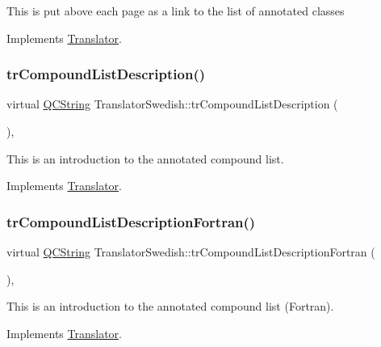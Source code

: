 This is put above each page as a link to the list of annotated classes 

Implements \mbox{\hyperlink{class_translator}{Translator}}.

\mbox{\label{class_translator_swedish_ab92f973f2376b0db20a44d75f3a2132d}} 
\subsubsection{\texorpdfstring{trCompoundListDescription()}{trCompoundListDescription()}}
{\footnotesize\ttfamily virtual \mbox{\hyperlink{class_q_c_string}{Q\+C\+String}} Translator\+Swedish\+::tr\+Compound\+List\+Description (\begin{DoxyParamCaption}{ }\end{DoxyParamCaption})\hspace{0.3cm}{\ttfamily [inline]}, {\ttfamily [virtual]}}

This is an introduction to the annotated compound list. 

Implements \mbox{\hyperlink{class_translator}{Translator}}.

\mbox{\label{class_translator_swedish_aad15dd63cfe4f9bfd79e3b0eea8293d1}} 
\subsubsection{\texorpdfstring{trCompoundListDescriptionFortran()}{trCompoundListDescriptionFortran()}}
{\footnotesize\ttfamily virtual \mbox{\hyperlink{class_q_c_string}{Q\+C\+String}} Translator\+Swedish\+::tr\+Compound\+List\+Description\+Fortran (\begin{DoxyParamCaption}{ }\end{DoxyParamCaption})\hspace{0.3cm}{\ttfamily [inline]}, {\ttfamily [virtual]}}

This is an introduction to the annotated compound list (Fortran). 

Implements \mbox{\hyperlink{class_translator}{Translator}}.

